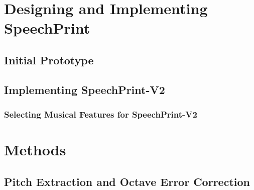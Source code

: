 \chapter{Designing and Implementing SpeechPrint}

\section{Initial Prototype}

\section{Implementing SpeechPrint-V2}

\subsection{Selecting Musical Features for SpeechPrint-V2}






\chapter{Methods}
\label{methods}

\section{Pitch Extraction and Octave Error Correction}
\label{sec:pitch_extraction}

